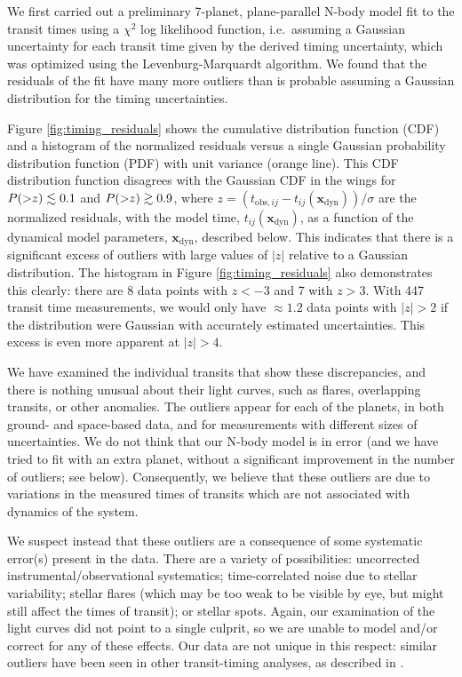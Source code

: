 \documentclass[twocolumn]{aastex63}
\begin{document}
We first carried out a preliminary 7-planet, plane-parallel N-body model fit to the transit times using a $\chi^2$ log likelihood function, i.e.\ assuming a Gaussian uncertainty for each transit time given by the derived timing uncertainty, which was optimized using the Levenburg-Marquardt algorithm.
We found that the residuals of the fit have many more outliers than is probable assuming
a Gaussian distribution for the timing uncertainties.

Figure \ref{fig:timing_residuals} shows the cumulative distribution
function (CDF)
and a histogram of the normalized residuals versus a single Gaussian
probability distribution function (PDF) with unit variance (orange line).  
This CDF distribution function disagrees with the Gaussian CDF
in the wings for $P({>}z) \lesssim 0.1$ and $P({>}z) \gtrsim 0.9$,
where $z {=} (t_{\mathrm{obs},ij} {-} t_{ij}(\mathbf{x}_\mathrm{dyn}))/\sigma$ are the normalized residuals, with the model time, $t_{ij}(\mathbf{x}_\mathrm{dyn})$, as a function of the dynamical model parameters, $\mathbf{x}_\mathrm{dyn}$, described below.
This indicates that there is a significant excess of outliers with
large values of $\vert z\vert$
relative to a Gaussian distribution.  The histogram in Figure
\ref{fig:timing_residuals} also demonstrates this clearly:  there
are 8 data points with $z {<} -3$ and 7 with $z {>} 3$.  With 447
transit time measurements, we would only have $\approx 1.2$ data points
with $\vert z\vert {>} 2$ if the distribution were Gaussian with accurately estimated 
uncertainties.  This excess is even more apparent at 
$\vert z \vert {>} 4$. %

We have examined the individual transits that show these discrepancies,
and there is nothing unusual about their light curves, such as flares, 
overlapping transits, or other anomalies.  %
The outliers
appear for each of the planets, in both ground- and space-based data, 
and for measurements with different sizes of uncertainties.  We do
not think that our N-body model is in error (and we have tried to fit
with an extra planet, without a significant improvement in the number
of outliers; see below).  Consequently, we believe that these outliers
are due to variations in the measured times of transits which are not
associated with dynamics of the system.  

We suspect instead that these outliers
are a consequence of some systematic error(s) present in the data.  There are a variety
of possibilities:  uncorrected instrumental/observational systematics;
time-correlated noise due to stellar variability;  stellar flares (which
may be too weak to be visible by eye, but might still affect the
times of transit); or stellar spots.  Again, our examination of
the light curves did not point to a single culprit, so we are unable
to model and/or correct for any of these effects.  Our data are not unique in this respect:  similar outliers
have been seen in other transit-timing analyses, as described
in \citet{JontofHutter2016}.
\end{document}
